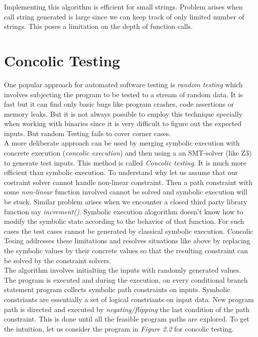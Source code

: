 \documentclass[12pt,oneside]{book}
\begin{document}
Implementing this algorithm is efficient for small strings. Problem arises when call string generated is large since we can keep track of only limited number of strings. This poses a limitation on the depth of function calls.



\section {Concolic Testing}

One popular approach for automated software testing is \textit{random testing} which involves subjecting the program to be tested to a stream of random data. It is fast but it can find only basic bugs like program crashes, code assertions or memory leaks. But it is not always possible to employ this technique specially when working with binaries since it is very difficult to figure out the expected inputs. But random Testing fails to cover corner cases.\\

A more deliberate approach can be used by merging symbolic execution with concrete execution (\textit{concolic execution}) and then using a an SMT-solver (like Z3) to generate test inputs. This method is called \textit{Concolic testing}. It is much more efficient than symbolic execution. To understand why let us assume that our costraint solver cannot handle non-linear constraint. Then a path constraint with some \textit{non-linear} function involved cannot be solved and symbolic execution will be stuck. Similar problem arises when we encounter a closed third party library function say \textit{increment()}. Symbolic execution alogorithm doesn't know how to modify the symbolic state according to the behavior of that function. For such cases the test cases cannot be generated by classical symbolic execution. Concolic Tesing addresses these limitations and resolves situations like above by replacing the symbolic values by their concrete values so that the resulting constraint can be solved by the constraint solvers.\\

The algorithm involves initialting the inputs with randomly generated values. The program is executed and during the execution, on every conditional branch statement program collects symbolic path constraints on inputs. Symbolic constriants are essentially a set of logical constriants on input data. New program path is directed and executed by \textit{negating/flipping} the last condition of the path constraint. This is done until all the feasible program paths are explored. To get the intuition, let us consider the program in \textit{Figure 2.2} for concolic testing.  
\end{document}

